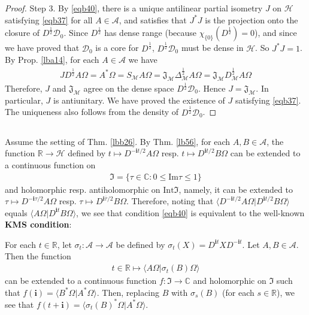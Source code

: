 \documentclass[12pt,b5paper,notitlepage]{article}
\theoremstyle{definition}
\theoremstyle{plain}
\newcommand{\fk}{\mathfrak}
\newcommand{\mc}{\mathcal}
\newcommand{\ovl}{\overline}
\newcommand{\Dom}{\scr{D}}
\newcommand{\bk}[1]{\langle {#1}\rangle}
\newcommand{\scr}{\mathscr}
\newcommand{\im}{\mathbf{i}}
\newcommand{\Cbb}{\mathbb C}
\newcommand{\Rbb}{\mathbb R}
\newcommand{\Imag}{\mathrm{Im}}
\newcommand{\Int}{\mathrm{Int}}
\numberwithin{equation}{section}
\begin{document}
\begin{proof}
Step 3. By \eqref{eqb40}, there is a unique antilinear partial isometry $J$ on $\mc H$ satisfying \eqref{eqb37} for all $A\in\scr A$, and satisfies that $J^*J$ is the projection onto the closure of $D^{\frac 12}\Dom_0$. Since $D^{\frac 12}$ has dense range (because $\chi_{\{0\}}(D^{\frac 12})=0$), and since we have proved that $\Dom_0$ is a core for $D^{\frac 12}$,  $D^{\frac 12}\Dom_0$ must be dense in $\mc H$. So $J^*J=1$. By Prop. \ref{lba14}, for each $A\in\scr A$ we have
\begin{align*}
JD^{\frac 12}A\Omega=A^*\Omega= S_{\mc M}A\Omega=\fk J_{\mc M}\Delta_{\mc M}^{\frac 12}A\Omega=\fk J_{\mc M}D_{\mc M}^{\frac 12}A\Omega
\end{align*}
Therefore, $J$ and $\fk J_{\mc M}$ agree on the dense space $D^{\frac 12}\Dom_0$. Hence $J=\fk J_{\mc M}$. In particular, $J$ is antiunitary. We have proved the existence of $J$ satisfying \eqref{eqb37}. The uniqueness also follows from the density of $D^{\frac 12}\Dom_0$.
\end{proof}




\subsection{}

Assume the setting of Thm. \ref{lbb26}. By Thm. \ref{lb56}, for each $A,B\in\scr A$, the function $\Rbb\rightarrow\mc H$ defined by $t\mapsto D^{-\im t/2}A\Omega$ resp. $t\mapsto D^{\im t/2}B\Omega$ can be extended to a continuous function on
\begin{align*}
\fk I=\{\tau\in\Cbb:0\leq\Imag \tau\leq 1\}
\end{align*}
and holomorphic resp. antiholomorphic on $\Int\fk I$, namely, it can be extended to $\tau\mapsto D^{-\im\tau/2}A\Omega$ resp. $\tau\mapsto D^{\im\ovl\tau/2}B\Omega$. Therefore, noting that $\bk{D^{-\im t/2}A\Omega|D^{\im t/2}B\Omega}$ equals $\bk{A\Omega|D^{\im t}B\Omega}$, we see that  condition \eqref{eqb40} is equivalent to the well-known \textbf{KMS condition}: 

For each $t\in\Rbb$, let $\sigma_t:\scr A\rightarrow\scr A$ be defined by $\sigma_t(X)=D^{\im t}XD^{-\im t}$. Let $A,B\in\scr A$. Then the function
\begin{align*}
t\in\Rbb\mapsto \bk{A\Omega|\sigma_t(B)\Omega}
\end{align*}
can be extended to a continuous function $f:\fk I\rightarrow\Cbb$ and holomorphic on $\fk I$ such that  $f(\im)=\bk{B^*\Omega|A^*\Omega}$. Then, replacing $B$ with $\sigma_s(B)$ (for each $s\in\Rbb$), we see that $f(t+\im)=\bk{\sigma_t(B)^*\Omega|A^*\Omega}$.
\end{document}

